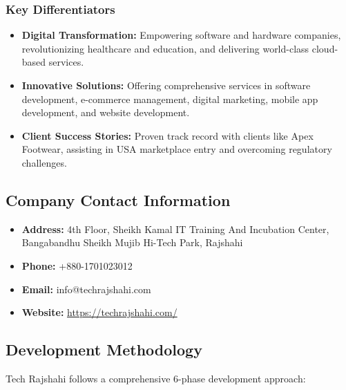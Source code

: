 \documentclass[12pt,a4paper]{article}
\begin{document}
\subsubsection{Key Differentiators}
\begin{itemize}
    \item \textbf{Digital Transformation:} Empowering software and hardware companies, revolutionizing healthcare and education, and delivering world-class cloud-based services.
    
    \item \textbf{Innovative Solutions:} Offering comprehensive services in software development, e-commerce management, digital marketing, mobile app development, and website development.
    
    \item \textbf{Client Success Stories:} Proven track record with clients like Apex Footwear, assisting in USA marketplace entry and overcoming regulatory challenges.
\end{itemize}

\subsection{Company Contact Information}
\begin{itemize}
    \item \textbf{Address:} 4th Floor, Sheikh Kamal IT Training And Incubation Center, Bangabandhu Sheikh Mujib Hi-Tech Park, Rajshahi
    \item \textbf{Phone:} +880-1701023012
    \item \textbf{Email:} info@techrajshahi.com
    \item \textbf{Website:} \href{https://techrajshahi.com/}{https://techrajshahi.com/}
\end{itemize}

\subsection{Development Methodology}
Tech Rajshahi follows a comprehensive 6-phase development approach:
\end{document}
